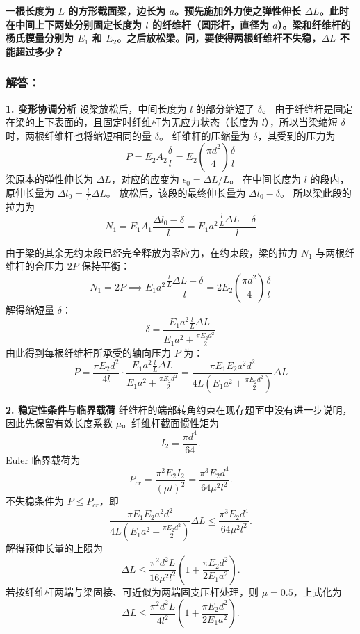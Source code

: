 \documentclass[11pt,a4paper]{ctexrep}
\begin{document}
{\textbf{一根长度为 $L$ 的方形截面梁，边长为 $a$。预先施加外力使之弹性伸长 $\Delta L$。此时在中间上下两处分别固定长度为 $l$ 的纤维杆（圆形杆，直径为 $d$）。梁和纤维杆的杨氏模量分别为 $E_1$ 和 $E_2$。之后放松梁。问，要使得两根纤维杆不失稳，$\Delta L$ 不能超过多少？}

\subsubsection*{解答：}

\textbf{1. 变形协调分析}
设梁放松后，中间长度为 $l$ 的部分缩短了 $\delta$。
由于纤维杆是固定在梁的上下表面的，且固定时纤维杆为无应力状态（长度为 $l$），所以当梁缩短 $\delta$ 时，两根纤维杆也将缩短相同的量 $\delta$。
纤维杆的压缩量为 $\delta$，其受到的压力为
  \[
  P = E_2 A_2 \frac{\delta}{l} = E_2 \left(\frac{\pi d^2}{4}\right) \frac{\delta}{l}
  \]
梁原本的弹性伸长为 $\Delta L$，对应的应变为 $\epsilon_0 = \Delta L / L$。
  在中间长度为 $l$ 的段内，原伸长量为 $\Delta l_0 = \frac{l}{L} \Delta L$。
  放松后，该段的最终伸长量为 $\Delta l_0 - \delta$。
  所以梁此段的拉力为
  \[
  N_1 = E_1 A_1 \frac{\Delta l_0 - \delta}{l} = E_1 a^2 \frac{\frac{l}{L}\Delta L - \delta}{l}
  \]

由于梁的其余无约束段已经完全释放为零应力，在约束段，梁的拉力 $N_1$ 与两根纤维杆的合压力 $2P$ 保持平衡：
\[
N_1 = 2P \implies E_1 a^2 \frac{\frac{l}{L}\Delta L - \delta}{l} = 2 E_2 \left(\frac{\pi d^2}{4}\right) \frac{\delta}{l}
\]
解得缩短量 $\delta$：
\[
\delta = \frac{E_1 a^2 \frac{l}{L}\Delta L}{E_1 a^2 + \frac{\pi E_2 d^2}{2}}
\]
由此得到每根纤维杆所承受的轴向压力 $P$ 为：
\[
P = \frac{\pi E_2 d^2}{4 l} \cdot \frac{E_1 a^2 \frac{l}{L}\Delta L}{E_1 a^2 + \frac{\pi E_2 d^2}{2}} = \frac{\pi E_1 E_2 a^2 d^2}{4 L \left( E_1 a^2 + \frac{\pi E_2 d^2}{2} \right)} \Delta L
\]

\textbf{2. 稳定性条件与临界载荷}
纤维杆的端部转角约束在现存题面中没有进一步说明，因此先保留有效长度系数 $\mu$。纤维杆截面惯性矩为
\[
I_2=\frac{\pi d^4}{64}.
\]
Euler 临界载荷为
\[
P_{cr}=\frac{\pi^2E_2I_2}{(\mu l)^2}
=\frac{\pi^3E_2d^4}{64\mu^2l^2}.
\]
不失稳条件为 $P\le P_{cr}$，即
\[
\frac{\pi E_1 E_2 a^2 d^2}{4 L \left( E_1 a^2 + \frac{\pi E_2 d^2}{2} \right)} \Delta L
\le
\frac{\pi^3 E_2 d^4}{64\mu^2 l^2}.
\]
解得预伸长量的上限为
\[
\Delta L \le
\frac{\pi^2 d^2 L}{16\mu^2 l^2}
\left(1+\frac{\pi E_2d^2}{2E_1a^2}\right).
\]
若按纤维杆两端与梁固接、可近似为两端固支压杆处理，则 $\mu=0.5$，上式化为
\[
\Delta L \le
\frac{\pi^2 d^2 L}{4 l^2}
\left(1+\frac{\pi E_2d^2}{2E_1a^2}\right).
\]


}
\end{document}
